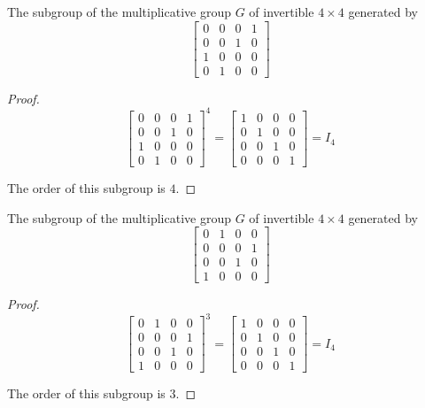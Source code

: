 \newpage
\begin{exercise}
    The subgroup of the multiplicative group $G$ of invertible $4\times 4$ generated by
    \[
        \begin{bmatrix}
            0 & 0 & 0 & 1 \\
            0 & 0 & 1 & 0 \\
            1 & 0 & 0 & 0 \\
            0 & 1 & 0 & 0
        \end{bmatrix}
    \]
\end{exercise}

\begin{proof}
    \[
        {\begin{bmatrix}
                    0 & 0 & 0 & 1 \\
                    0 & 0 & 1 & 0 \\
                    1 & 0 & 0 & 0 \\
                    0 & 1 & 0 & 0
                \end{bmatrix}}^{4} =
        \begin{bmatrix}
            1 & 0 & 0 & 0 \\
            0 & 1 & 0 & 0 \\
            0 & 0 & 1 & 0 \\
            0 & 0 & 0 & 1
        \end{bmatrix} = I_{4}
    \]

    The order of this subgroup is $4$.
\end{proof}

\newpage
\begin{exercise}
    The subgroup of the multiplicative group $G$ of invertible $4\times 4$ generated by
    \[
        \begin{bmatrix}
            0 & 1 & 0 & 0 \\
            0 & 0 & 0 & 1 \\
            0 & 0 & 1 & 0 \\
            1 & 0 & 0 & 0
        \end{bmatrix}
    \]
\end{exercise}

\begin{proof}
    \[
        {\begin{bmatrix}
                    0 & 1 & 0 & 0 \\
                    0 & 0 & 0 & 1 \\
                    0 & 0 & 1 & 0 \\
                    1 & 0 & 0 & 0
                \end{bmatrix}}^{3} =
        \begin{bmatrix}
            1 & 0 & 0 & 0 \\
            0 & 1 & 0 & 0 \\
            0 & 0 & 1 & 0 \\
            0 & 0 & 0 & 1
        \end{bmatrix} = I_{4}
    \]

    The order of this subgroup is $3$.
\end{proof}

